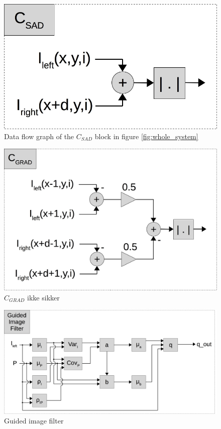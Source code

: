 \begin{figure}[ht!]
  \centering
  \includegraphics[scale=0.3]{figures/c_sad}
  \caption{Data flow graph of the $C_{SAD}$ block in figure \ref{fig:whole_system}}
  \label{fig:c_sad}
\end{figure}

\begin{figure}[ht!]
  \centering
  \includegraphics[scale=0.3]{figures/c_grad}
  \caption{$C_{GRAD}$ ikke sikker}
  \label{fig:c_grad}
\end{figure}

\begin{figure}[ht!]
  \centering
  \includegraphics[scale=0.3]{figures/guided_image_filter}
  \caption{Guided image filter}
  \label{fig:Guided_image_filter}
\end{figure}

